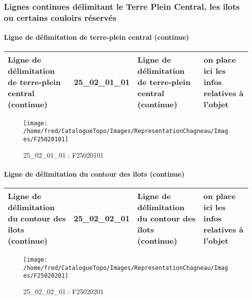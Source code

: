 \documentclass[12pt,titlepage,oneside]{book}
\begin{document}
\subsubsection{\large Lignes continues délimitant le Terre Plein Central, les ilots ou certains couloirs réservés}
\paragraph{Ligne de délimitation de terre-plein central (continue)}
\noindent
\vspace{\baselineskip}

\renewcommand{\arraystretch}{1.2}
\begin{supertabular}{|p{10cm}|c|p{13cm}|p{12cm}|}
 Ligne de délimitation de terre-plein central (continue) & 25\_02\_01\_01 & Ligne de délimitation de terre-plein central (continue) & on place ici les infos relatives à l'objet\\
\hline
\end{supertabular}
\begin{figure}[h!]
  \hfill         %
  \begin{minipage}[t]{3cm}
    \begin{center}
      \texttt{[image: /home/fred/CatalogueTopo/Images/RepresentationChagneau/Images/F25020101]}
      \caption[F25020101]{\label{} 25\_02\_01\_01 : F25020101}
    \end{center}
  \end{minipage}
\end{figure}


\paragraph{Ligne de délimitation du contour des îlots (continue)}
\noindent
\vspace{\baselineskip}

\renewcommand{\arraystretch}{1.2}
\begin{supertabular}{|p{10cm}|c|p{13cm}|p{12cm}|}
 Ligne de délimitation du contour des îlots (continue) & 25\_02\_02\_01 & Ligne de délimitation du contour des îlots (continue) & on place ici les infos relatives à l'objet\\
\hline
\end{supertabular}
\begin{figure}[h!]
  \hfill         %
  \begin{minipage}[t]{3cm}
    \begin{center}
      \texttt{[image: /home/fred/CatalogueTopo/Images/RepresentationChagneau/Images/F25020201]}
      \caption[F25020201]{\label{} 25\_02\_02\_01 : F25020201}
    \end{center}
  \end{minipage}
\end{figure}
\end{document}
